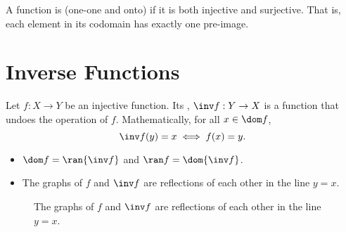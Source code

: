 \begin{definition}
    A function is  (one-one and onto) if it is both injective and surjective. That is, each element in its codomain has exactly one pre-image.
\end{definition}

\section{Inverse Functions}

\begin{definition}
    Let $f : X \to Y$ be an injective function. Its , $\inv f : Y \to X$ is a function that undoes the operation of $f$. Mathematically, for all $x \in \dom f$, \[\inv f(y) = x \iff f(x) = y.\]
\end{definition}

\begin{fact}
    \phantom{.}
    \begin{itemize}
        \item $\dom f = \ran{\inv f}$ and $\ran f = \dom{\inv f}$.
        \item The graphs of $f$ and $\inv f$ are reflections of each other in the line $y = x$.
    \end{itemize}
\end{fact}

\begin{figure}[H]
    \centering
    \caption{The graphs of $f$ and $\inv f$ are reflections of each other in the line $y = x$.}
\end{figure}

